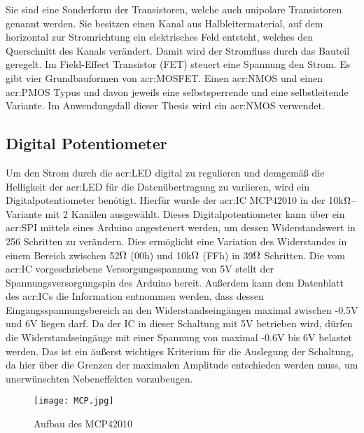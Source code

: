 Sie sind eine Sonderform der Transistoren, welche auch unipolare Transistoren genannt werden. Sie besitzen einen Kanal aus Halbleitermaterial, auf dem horizontal zur Stromrichtung ein elektrisches Feld entsteht, welches den Querschnitt des Kanals verändert. Damit wird der Stromfluss durch das Bauteil geregelt. Im Field-Effect Transistor (FET) steuert eine Spannung den Strom. Es gibt vier Grundbauformen von \gls{acr:MOSFET}. Einen \gls{acr:NMOS} und einen \gls{acr:PMOS} Typus und davon jeweils eine selbstsperrende und eine selbstleitende Variante. Im Anwendungsfall dieser Thesis wird ein \gls{acr:NMOS} verwendet. \cite{heringElektrotechnikUndElektronik2018}

\newpage
\subsection{Digital Potentiometer}
\label{subsec:Unterabschnitt12}

Um den Strom durch die \gls{acr:LED} digital zu regulieren und demgemäß die Helligkeit der \gls{acr:LED} für die Datenübertragung zu variieren, wird ein Digitalpotentiometer benötigt. Hierfür wurde der \gls{acr:IC} MCP42010 in der 10k$\ohm$–Variante mit 2 Kanälen ausgewählt. Dieses Digitalpotentiometer kann über ein \gls{acr:SPI} mittels eines Arduino angesteuert werden, um dessen Widerstandswert in 256 Schritten zu verändern. Dies ermöglicht eine Variation des Widerstandes in einem Bereich zwischen 52$\ohm$ (00h) und 10k$\ohm$ (FFh) in 39$\ohm$ Schritten. 
Die vom \gls{acr:IC} vorgeschriebene Versorgungsspannung von 5V stellt der Spannungsversorgungspin des Arduino bereit. Außerdem kann dem Datenblatt des \gls{acr:IC}s die Information entnommen werden, dass dessen Eingangsspannungsbereich an den Widerstandseingängen maximal zwischen -0.5V und 6V liegen darf. Da der IC in dieser Schaltung mit 5V betrieben wird, dürfen die Widerstandseingänge mit einer Spannung von maximal -0.6V bis 6V belastet werden. Das ist ein äußerst wichtiges Kriterium für die Auslegung der Schaltung, da hier über die Grenzen der maximalen Amplitude entschieden werden muss, um unerwünschten Nebeneffekten vorzubeugen.

\begin{figure}[H]
	\centering
	\texttt{[image: MCP.jpg]}
	\caption[Aufbau des MCP42010]{Aufbau des MCP42010} 
	\cite{MCP42}
	\label{fig:MCP}
\end{figure}

